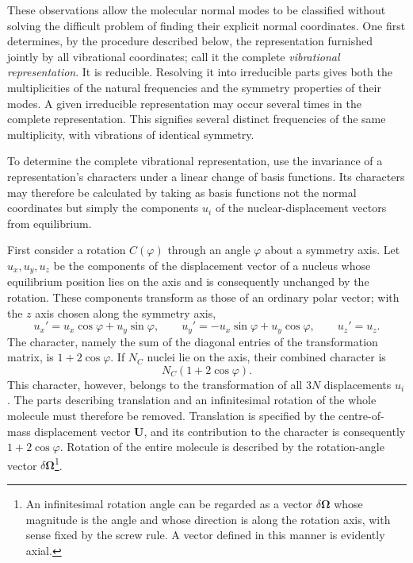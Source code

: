 These observations allow the molecular normal modes to be classified without solving the difficult problem of finding their explicit normal coordinates. One first determines, by the procedure described below, the representation furnished jointly by all vibrational coordinates; call it the complete \emph{vibrational representation}. It is reducible. Resolving it into irreducible parts gives both the multiplicities of the natural frequencies and the symmetry properties of their modes. A given irreducible representation may occur several times in the complete representation. This signifies several distinct frequencies of the same multiplicity, with vibrations of identical symmetry.

To determine the complete vibrational representation, use the invariance of a representation's characters under a linear change of basis functions. Its characters may therefore be calculated by taking as basis functions not the normal coordinates but simply the components $u_i$ of the nuclear-displacement vectors from equilibrium.






First consider a rotation $C(\varphi)$ through an angle $\varphi$ about a symmetry axis. Let $u_x,u_y,u_z$ be the components of the displacement vector of a nucleus whose equilibrium position lies on the axis and is consequently unchanged by the rotation. These components transform as those of an ordinary polar vector; with the $z$ axis chosen along the symmetry axis,
\[
 u_x'=u_x\cos\varphi+u_y\sin\varphi,\qquad
 u_y'=-u_x\sin\varphi+u_y\cos\varphi,\qquad
 u_z'=u_z.
\]
The character, namely the sum of the diagonal entries of the transformation matrix, is $1+2\cos\varphi$. If $N_C$ nuclei lie on the axis, their combined character is
\begin{equation}
 N_C(1+2\cos\varphi). \tag{100.3}
\end{equation}
This character, however, belongs to the transformation of all $3N$ displacements $u_i$. The parts describing translation and an infinitesimal rotation of the whole molecule must therefore be removed. Translation is specified by the centre-of-mass displacement vector $\mathbf U$, and its contribution to the character is consequently $1+2\cos\varphi$. Rotation of the entire molecule is described by the rotation-angle vector $\delta\boldsymbol\Omega$\footnote{An infinitesimal rotation angle can be regarded as a vector $\delta\boldsymbol\Omega$ whose magnitude is the angle and whose direction is along the rotation axis, with sense fixed by the screw rule. A vector defined in this manner is evidently axial.}.


